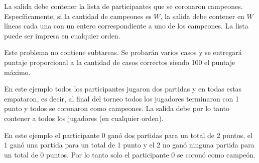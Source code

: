 \documentclass{oci}
\begin{document}
\begin{outputDescription}
  La salida debe contener la lista de participantes que se coronaron campeones.
  Específicamente, si la cantidad de campeones es $W$, la salida debe contener
  en $W$ líneas cada una con un entero correspondiente a uno de los campeones.
  La lista puede ser impresa en cualquier orden.
\end{outputDescription}

\begin{scoreDescription}
  Este problema no contiene subtareas.
  Se probarán varios casos y se entregará puntaje proporcional a la cantidad de casos correctos
  siendo 100 el puntaje máximo.
\end{scoreDescription}

\begin{sampleDescription}
\vspace{-1em}
En este ejemplo todos los participantes jugaron dos partidas y en todas estas empataron, es decir,
al final del torneo todos los jugadores terminaron con 1 punto y todos se coronaron como campeones.
La salida debe por lo tanto contener a todos los jugadores (en cualquier orden).
\vspace{1em}

\vspace{-1em}
En este ejemplo el participante 0 ganó dos partidas para un total de 2 puntos, el 1 ganó una partida
para un total de 1 punto y el 2 no ganó ninguna partida para un total de 0 puntos.
Por lo tanto solo el participante 0 se coronó como campeón.
\end{sampleDescription}
\vspace{1em}
\end{document}
